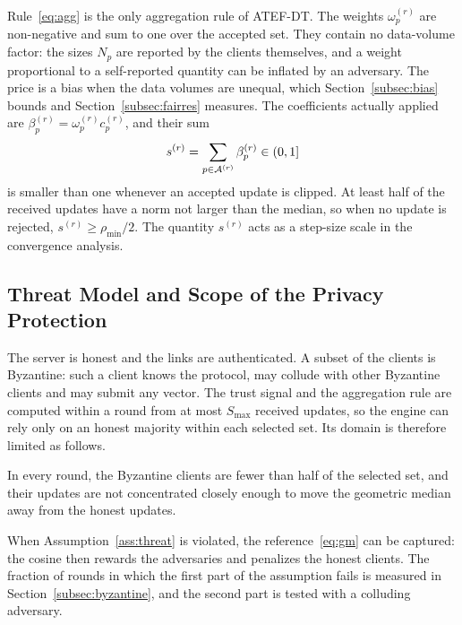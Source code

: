 \begin{revblock}Rule~\eqref{eq:agg} is the only aggregation rule of ATEF-DT. The weights $\omega_p^{(r)}$ are non-negative and sum to one over the accepted set. They contain no data-volume factor: the sizes $N_p$ are reported by the clients themselves, and a weight proportional to a self-reported quantity can be inflated by an adversary. The price is a bias when the data volumes are unequal, which Section~\ref{subsec:bias} bounds and Section~\ref{subsec:fairres} measures. The coefficients actually applied are $\beta_p^{(r)}=\omega_p^{(r)}c_p^{(r)}$, and their sum
\begin{equation}
	s^{(r)}=\sum_{p\in\mathcal{A}^{(r)}}\beta_p^{(r)}\in(0,1]
	\label{eq:stepscale}
\end{equation}
is smaller than one whenever an accepted update is clipped. At least half of the received updates have a norm not larger than the median, so when no update is rejected, $s^{(r)}\ge\rho_{\min}/2$. The quantity $s^{(r)}$ acts as a step-size scale in the convergence analysis.\end{revblock}

\subsection{Threat Model and Scope of the Privacy Protection}
\label{subsec:privacy}
The server is honest and the links are authenticated. A subset of the clients is Byzantine: such a client knows the protocol, may collude with other Byzantine clients and may submit any vector. The trust signal and the aggregation rule are computed within a round from at most $S_{\max}$ received updates, so the engine can rely only on an honest majority within each selected set. Its domain is therefore limited as follows.

\begin{assumption}
	\label{ass:threat}
	In every round, the Byzantine clients are fewer than half of the selected set, and their updates are not concentrated closely enough to move the geometric median away from the honest updates.
\end{assumption}

When Assumption~\ref{ass:threat} is violated, the reference~\eqref{eq:gm} can be captured: the cosine then rewards the adversaries and penalizes the honest clients. The fraction of rounds in which the first part of the assumption fails is measured in Section~\ref{subsec:byzantine}, and the second part is tested with a colluding adversary.

